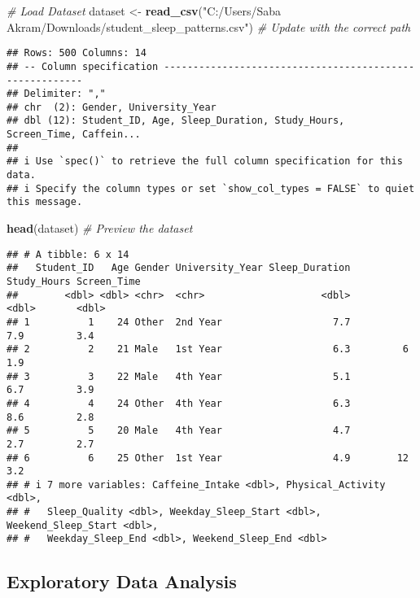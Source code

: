 \documentclass[
]{article}
\newenvironment{Shaded}{\begin{snugshade}}{\end{snugshade}}
\newcommand{\CommentTok}[1]{\textcolor[rgb]{0.56,0.35,0.01}{\textit{#1}}}
\newcommand{\FunctionTok}[1]{\textcolor[rgb]{0.13,0.29,0.53}{\textbf{#1}}}
\newcommand{\NormalTok}[1]{#1}
\newcommand{\OtherTok}[1]{\textcolor[rgb]{0.56,0.35,0.01}{#1}}
\newcommand{\StringTok}[1]{\textcolor[rgb]{0.31,0.60,0.02}{#1}}
\begin{document}
\begin{Shaded}
\begin{Highlighting}[]
\CommentTok{\# Load Dataset}
\NormalTok{dataset }\OtherTok{\textless{}{-}} \FunctionTok{read\_csv}\NormalTok{(}\StringTok{"C:/Users/Saba Akram/Downloads/student\_sleep\_patterns.csv"}\NormalTok{)  }\CommentTok{\# Update with the correct path}
\end{Highlighting}
\end{Shaded}

\begin{verbatim}
## Rows: 500 Columns: 14
## -- Column specification --------------------------------------------------------
## Delimiter: ","
## chr  (2): Gender, University_Year
## dbl (12): Student_ID, Age, Sleep_Duration, Study_Hours, Screen_Time, Caffein...
## 
## i Use `spec()` to retrieve the full column specification for this data.
## i Specify the column types or set `show_col_types = FALSE` to quiet this message.
\end{verbatim}

\begin{Shaded}
\begin{Highlighting}[]
\FunctionTok{head}\NormalTok{(dataset)  }\CommentTok{\# Preview the dataset}
\end{Highlighting}
\end{Shaded}

\begin{verbatim}
## # A tibble: 6 x 14
##   Student_ID   Age Gender University_Year Sleep_Duration Study_Hours Screen_Time
##        <dbl> <dbl> <chr>  <chr>                    <dbl>       <dbl>       <dbl>
## 1          1    24 Other  2nd Year                   7.7         7.9         3.4
## 2          2    21 Male   1st Year                   6.3         6           1.9
## 3          3    22 Male   4th Year                   5.1         6.7         3.9
## 4          4    24 Other  4th Year                   6.3         8.6         2.8
## 5          5    20 Male   4th Year                   4.7         2.7         2.7
## 6          6    25 Other  1st Year                   4.9        12           3.2
## # i 7 more variables: Caffeine_Intake <dbl>, Physical_Activity <dbl>,
## #   Sleep_Quality <dbl>, Weekday_Sleep_Start <dbl>, Weekend_Sleep_Start <dbl>,
## #   Weekday_Sleep_End <dbl>, Weekend_Sleep_End <dbl>
\end{verbatim}

\subsection{Exploratory Data Analysis}\label{exploratory-data-analysis}
\end{document}
